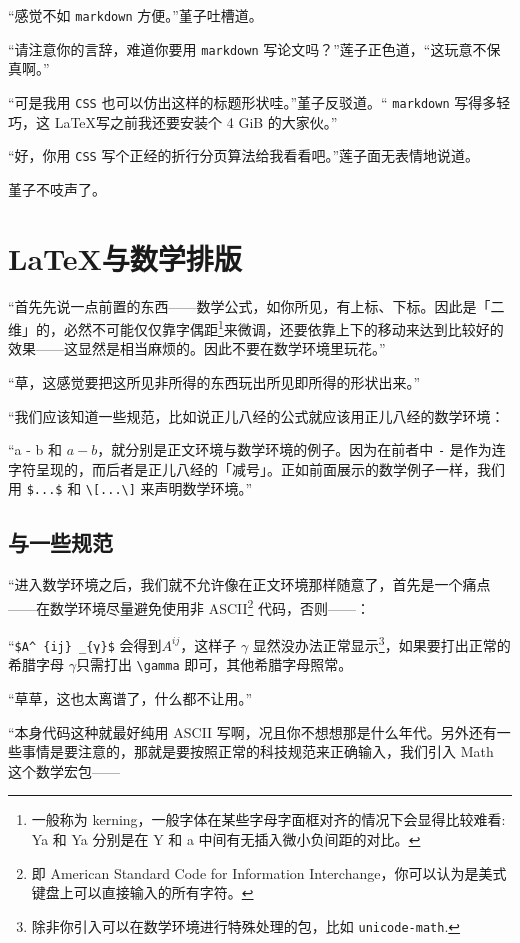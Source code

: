 “感觉不如 \verb"markdown"%
方便。”堇子吐槽道。

“请注意你的言辞，难道你要用 \verb"markdown" 写论文吗？”莲子正色道，“这玩意不保真啊。”

“可是我用 \verb"CSS" 也可以仿出这样的标题形状哇。”堇子反驳道。“ \verb"markdown"%
写得多轻巧，这 \LaTeX 写之前我还要安装个 4 GiB 的大家伙。”

“好，你用 \verb"CSS" 写个正经的折行分页算法给我看看吧。”莲子面无表情地说道。

堇子不吱声了。



\section{\LaTeX 与数学排版}

“首先先说一点前置的东西——数学公式，如你所见，有上标、下标。因此是「二维」的，必然不可能仅仅靠字偶距\footnote{一般称为 kerning，一般字体在某些字母字面框对齐的情况下会显得比较难看: {Y}{a} 和 Ya 分别是在 Y 和 a 中间有无插入微小负间距的对比。}来微调，还要依靠上下的移动来达到比较好的效果——这显然是相当麻烦的。因此不要在数学环境里玩花。”

“草，这感觉要把这所见非所得的东西玩出所见即所得的形状出来。”

“我们应该知道一些规范，比如说正儿八经的公式就应该用正儿八经的数学环境：

“a - b 和 $a - b$，就分别是正文环境与数学环境的例子。因为在前者中 \verb"-" 是作为连字符呈现的，而后者是正儿八经的「减号」。正如前面展示的数学例子一样，我们用 \verb"$...$" 和 \verb"\[...\]" 来声明数学环境。”

\subsection{\AmS 与一些规范}

“进入数学环境之后，我们就不允许像在正文环境那样随意了，首先是一个痛点——在数学环境尽量避免使用非 ASCII\footnote{即
    American Standard Code for Information Interchange，你可以认为是美式键盘上可以直接输入的所有字符。} 代码，否则——：

“\verb"$A^ {ij} _{γ}$" 会得到$
    A^{ij} %
$，这样子 $\gamma $ 显然没办法正常显示\footnote{除非你引入可以在数学环境进行特殊处理的包，比如 \texttt{unicode-math}.}，如果要打出正常的希腊字母 $\gamma $只需打出 \verb"\gamma" 即可，其他希腊字母照常。

“草草，这也太离谱了，什么都不让用。”

“本身代码这种就最好纯用 ASCII 写啊，况且你不想想那是什么年代。另外还有一些事情是要注意的，那就是要按照正常的科技规范来正确输入，我们引入 \AmS{}Math 这个数学宏包——


